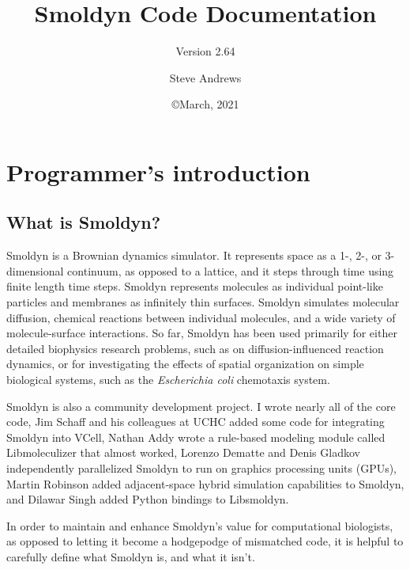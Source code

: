 \documentclass {scrbook}
\begin{document}

\title{Smoldyn Code Documentation} 
\subtitle{Version 2.64}
\date{\copyright March, 2021}
\author{Steve Andrews}
\maketitle

\tableofcontents


\chapter{Programmer's introduction}

\section{What is Smoldyn?}

Smoldyn is a Brownian dynamics simulator. It represents space as a 1-, 2-, or 3-dimensional continuum, as opposed to a lattice, and it steps through time using finite length time steps. Smoldyn represents molecules as individual point-like particles and membranes as infinitely thin surfaces. Smoldyn simulates molecular diffusion, chemical reactions between individual molecules, and a wide variety of molecule-surface interactions. So far, Smoldyn has been used primarily for either detailed biophysics research problems, such as on diffusion-influenced reaction dynamics, or for investigating the effects of spatial organization on simple biological systems, such as the \emph{Escherichia coli} chemotaxis system.

Smoldyn is also a community development project. I wrote nearly all of the core code, Jim Schaff and his colleagues at UCHC added some code for integrating Smoldyn into VCell, Nathan Addy wrote a rule-based modeling module called Libmoleculizer that almost worked, Lorenzo Dematte and Denis Gladkov independently parallelized Smoldyn to run on graphics processing units (GPUs), Martin Robinson added adjacent-space hybrid simulation capabilities to Smoldyn, and Dilawar Singh added Python bindings to Libsmoldyn.

In order to maintain and enhance Smoldyn's value for computational biologists, as opposed to letting it become a hodgepodge of mismatched code, it is helpful to carefully define what Smoldyn is, and what it isn't.
\end{document}
